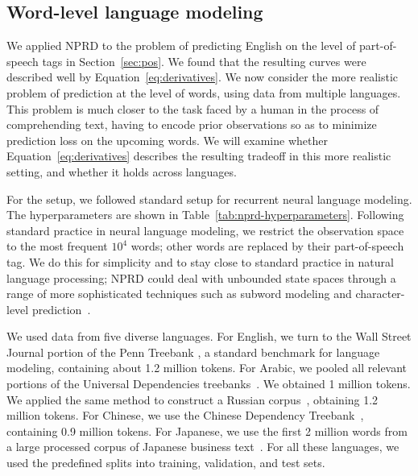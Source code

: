\documentclass[entropy,article,submit,moreauthors,pdftex,10pt,a4paper]{Definitions/mdpi}
\let\oldequation\equation
\let\oldendequation\endequation
\renewenvironment{equation}
  {\linenomathNonumbers\oldequation}
  {\oldendequation\endlinenomath}
\begin{document}
\subsection{Word-level language modeling}\label{sec:words}


We applied NPRD to the problem of predicting English on the level of part-of-speech tags in Section~\ref{sec:pos}.
We found that the resulting curves were described well by Equation~\ref{eq:derivatives}.
We now consider the more realistic problem of prediction at the level of words, using data from multiple languages.
This problem is much closer to the task faced by a human in the process of comprehending text, having to encode prior observations so as to minimize prediction loss on the upcoming words.
We will examine whether Equation~\ref{eq:derivatives} describes the resulting tradeoff in this more realistic setting, and whether it holds across languages.

For the setup, we followed standard setup for recurrent neural language modeling.
The hyperparameters are shown in Table~\ref{tab:nprd-hyperparameters}.
Following standard practice in neural language modeling, we restrict the observation space to the most frequent $10^4$ words; other words are replaced by their part-of-speech tag.
We do this for simplicity and to stay close to standard practice in natural language processing; NPRD could deal with unbounded state spaces through a range of more sophisticated techniques such as subword modeling and character-level prediction~\citep{kim2016character,luong2016achieving}.


We used data from five diverse languages.
For English, we turn to the Wall Street Journal portion of the Penn Treebank \citep{marcus-building-1993}, a standard benchmark for language modeling, containing about 1.2 million tokens.
For Arabic, we pooled all relevant portions of the Universal Dependencies treebanks~\citep{nivre-universal-2016,maamouri2004penn,hajic2004prague}. We obtained 1 million tokens.
We applied the same method to construct a Russian corpus~\citep{syntagrus}, obtaining 1.2 million tokens.
For Chinese, we use the Chinese Dependency Treebank~\citep{che2012chinese}, containing 0.9 million tokens.
For Japanese, we use the first 2 million words from a large processed corpus of Japanese business text~\citep{graff1995japanese}.
For all these languages, we used the predefined splits into training, validation, and test sets.
\end{document}
